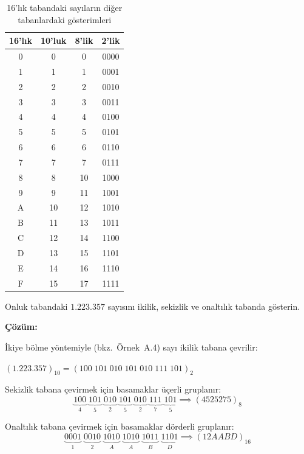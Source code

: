 \begin{table}[H]
\centering
\caption{16'lık tabandaki sayıların diğer tabanlardaki gösterimleri}
\label{tab:hex-tablo}
\begin{tabular}{cccc}
\toprule
\textbf{16'lık} & \textbf{10'luk} & \textbf{8'lik} & \textbf{2'lik} \\
\midrule
0 & 0  & 0  & 0000 \\
1 & 1  & 1  & 0001 \\
2 & 2  & 2  & 0010 \\
3 & 3  & 3  & 0011 \\
4 & 4  & 4  & 0100 \\
5 & 5  & 5  & 0101 \\
6 & 6  & 6  & 0110 \\
7 & 7  & 7  & 0111 \\
8 & 8  & 10 & 1000 \\
9 & 9  & 11 & 1001 \\
A & 10 & 12 & 1010 \\
B & 11 & 13 & 1011 \\
C & 12 & 14 & 1100 \\
D & 13 & 15 & 1101 \\
E & 14 & 16 & 1110 \\
F & 15 & 17 & 1111 \\
\bottomrule
\end{tabular}
\end{table}

\begin{ornek}[A.9]
Onluk tabandaki $1.223.357$ sayısını ikilik, sekizlik ve onaltılık tabanda gösterin.

\textbf{Çözüm:}

İkiye bölme yöntemiyle (bkz.\ Örnek~A.4) sayı ikilik tabana çevrilir:

$(1.223.357)_{10} = (100\;101\;010\;101\;010\;111\;101)_2$

Sekizlik tabana çevirmek için basamaklar üçerli gruplanır:
\[
\underbrace{100}_{4}\;\underbrace{101}_{5}\;\underbrace{010}_{2}\;\underbrace{101}_{5}\;\underbrace{010}_{2}\;\underbrace{111}_{7}\;\underbrace{101}_{5} \implies (4525275)_8
\]

Onaltılık tabana çevirmek için basamaklar dörderli gruplanır:
\[
\underbrace{0001}_{1}\;\underbrace{0010}_{2}\;\underbrace{1010}_{A}\;\underbrace{1010}_{A}\;\underbrace{1011}_{B}\;\underbrace{1101}_{D} \implies (12AABD)_{16}
\]
\end{ornek}


